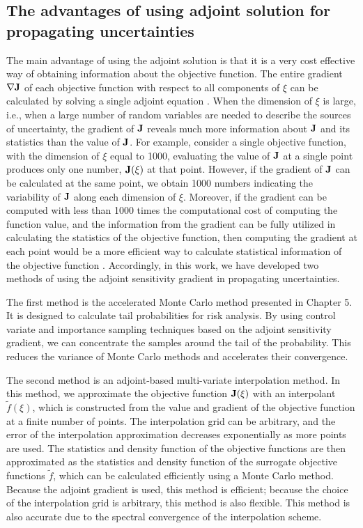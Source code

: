 \subsection{The advantages of using adjoint solution for propagating
uncertainties} \label{s:intro2}

The main advantage of using the adjoint solution is that it is a very cost
effective way of obtaining information about the objective function.
The entire gradient $\nabla {\bf J}$ of each objective function with respect to
all components of $\xi$ can be calculated by solving a single adjoint equation
\cite[]{adjoint2}.
When the dimension of $\xi$ is large, i.e., when a large number of random
variables are needed to describe the sources of
uncertainty, the gradient of $\bf J$ reveals much more information about
$\bf J$ and its statistics than the value of $\bf J$.  For example, consider a
single objective function, with the dimension of $\xi$ equal to 1000, evaluating
the value of $\bf J$ at a single point produces only one number,
${\bf J}(\xi)$ at that
point.  However, if the gradient of $\bf J$ can be calculated at the same point,
we obtain 1000 numbers indicating the variability of $\bf J$ along each
dimension of $\xi$.
Moreover, if the gradient can be computed with less than 1000 times the
computational
cost of computing the function value, and the information from the gradient
can be fully utilized in calculating the statistics of the objective function,
then computing the gradient at each point would be a more efficient way to
calculate statistical information of the objective function \cite[]{dakota}.
Accordingly, in this work, we have developed two methods of using the adjoint
sensitivity gradient in propagating uncertainties.

The first method is the accelerated Monte Carlo method presented in
Chapter 5.  It is designed
to calculate tail probabilities for risk analysis.  By using control variate
and importance sampling techniques based on the adjoint sensitivity gradient,
we can concentrate the samples around the tail of the probability.
This reduces the variance of Monte Carlo methods and accelerates their
convergence.

The second method is an adjoint-based multi-variate interpolation method.
In this method, we approximate the objective function ${\bf J}(\xi)$ with an
interpolant ${\tilde f}(\xi)$, which is constructed from the value and
gradient of the objective function at a finite number of points.
The interpolation grid can be arbitrary, and the error of the interpolation
approximation decreases exponentially as more points are used.
The statistics and density function of the objective
functions are then approximated as the statistics and density function of the
surrogate objective functions $\tilde f$, which can be calculated efficiently
using a Monte Carlo method.  Because the adjoint gradient is used, this
method is efficient; because the choice of the interpolation grid is arbitrary,
this method is also flexible. This method is also accurate
due to the spectral convergence of the interpolation scheme.

